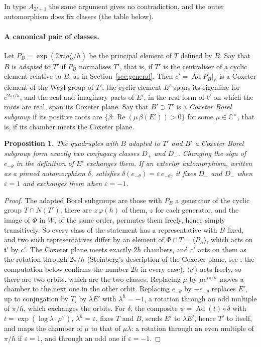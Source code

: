 \documentclass[11pt,a4paper]{amsart}
\newtheorem{proposition}[theorem]{Proposition}
\theoremstyle{definition}
\theoremstyle{remark}
\newcommand{\C}{\mathbb C}
\begin{document}
In type $A_{2l+1}$ the same argument gives no contradiction, and the outer automorphism does fix classes (the table below).

\paragraph{A canonical pair of classes.} Let $P_B = \exp(2\pi i\rho_B^\vee/h)$ be the principal element of $T$ defined by $B$. Say that $B$ is \emph{adapted} to $T'$ if $P_B$ normalises $T'$, that is, if $T'$ is the centraliser of a cyclic element relative to $B$, as in Section~\ref{sec:general}. Then $c' = \operatorname{Ad}P_B|_{\mathfrak t'}$ is a Coxeter element of the Weyl group of $T'$, the cyclic element $E'$ spans its eigenline for $e^{2\pi i/h}$, and the real and imaginary parts of $E'$, in the real form of $\mathfrak t'$ on which the roots are real, span its Coxeter plane. Say that $B' \supset T'$ is a \emph{Coxeter Borel subgroup} if its positive roots are $\{\beta : \operatorname{Re}(\mu\,\beta(E')) > 0\}$ for some $\mu \in \C^\times$, that is, if its chamber meets the Coxeter plane.

\begin{proposition}\label{prop:pair}
The quadruples with $B$ adapted to $T'$ and $B'$ a Coxeter Borel subgroup form exactly two conjugacy classes $D_+$ and $D_-$. Changing the sign of $e_{-\theta}$ in the definition of $E'$ exchanges them. If an exterior automorphism, written as a pinned automorphism $\delta$, satisfies $\delta(e_{-\theta}) = \varepsilon\,e_{-\theta}$, it fixes $D_+$ and $D_-$ when $\varepsilon = 1$ and exchanges them when $\varepsilon = -1$.
\end{proposition}

\begin{proof}
The adapted Borel subgroups are those with $P_B$ a generator of the cyclic group $T \cap N(T')$; there are $z\,\varphi(h)$ of them, $z$ for each generator, and the image of $\Phi$ in $W$, of the same order, permutes them freely, hence simply transitively. So every class of the statement has a representative with $B$ fixed, and two such representatives differ by an element of $\Phi \cap T = \langle P_B \rangle$, which acts on $\mathfrak t'$ by $c'$. The Coxeter plane meets exactly $2h$ chambers, and $c'$ acts on them as the rotation through $2\pi/h$ (Steinberg's description of the Coxeter plane, see \cite[\S3.17--3.19]{humphreys}; the computation below confirms the number $2h$ in every case); $\langle c'\rangle$ acts freely, so there are two orbits, which are the two classes. Replacing $\mu$ by $\mu e^{i\pi/h}$ moves a chamber to the next one in the other orbit. Replacing $e_{-\theta}$ by $-e_{-\theta}$ replaces $E'$, up to conjugation by $T$, by $\lambda E'$ with $\lambda^h = -1$, a rotation through an odd multiple of $\pi/h$, which exchanges the orbits. For $\delta$, the composite $\psi = \operatorname{Ad}(t)\circ\delta$ with $t = \exp(\log\lambda\cdot\rho^\vee)$, $\lambda^h = \varepsilon$, fixes $T$ and $B$, sends $E'$ to $\lambda E'$, hence $T'$ to itself, and maps the chamber of $\mu$ to that of $\mu\lambda$: a rotation through an even multiple of $\pi/h$ if $\varepsilon = 1$, and through an odd one if $\varepsilon = -1$.
\end{proof}
\end{document}
